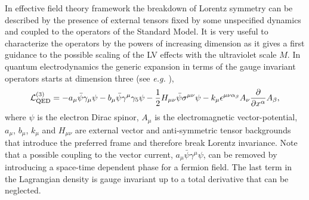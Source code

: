 \documentclass[paper,12pt]{revtex4}
\begin{document}
In effective field theory framework the breakdown of Lorentz 
symmetry can be described by the presence of external tensors fixed 
by some unspecified dynamics and coupled to the operators of the
Standard Model. It is very useful to characterize the operators by the powers 
of increasing dimension as it gives a first guidance to the 
possible scaling of the LV effects with the ultraviolet scale $M$. 
In quantum electrodynamics the generic expansion
in terms of the gauge invariant operators starts at dimension three (see {\em e.g.}
\cite{Kost1}),
\begin{equation}
{\cal L}_{\rm QED}^{(3)} =
-a_\mu \bar \psi \gamma_\mu \psi
- b_\mu \bar \psi \gamma^\mu \gamma_5 \psi - \frac{1}{2}H_{\mu\nu}\bar
\psi \sigma^{\mu\nu} \psi - k_\mu \epsilon^{\mu\nu\alpha_\beta}
A_\nu \frac{\partial}{\partial x^\alpha} A_\beta, \label{qed}
\label{kostelecky}
\end{equation}
where $\psi$ is the electron Dirac spinor, $A_\mu$ is the
electromagnetic vector-potential, $a_{\mu}$,
$b_\mu$, $k_\mu$ and $H_{\mu\nu}$ are external vector and
anti-symmetric tensor backgrounds that introduce the preferred
frame and therefore break Lorentz invariance. Note that a possible
coupling to the vector current, $a_\mu \bar \psi \gamma^\mu \psi$,
can be removed by introducing a space-time dependent phase for a
fermion field. The last term in the Lagrangian density is gauge
invariant up to a total derivative that can be neglected. 
\end{document}
